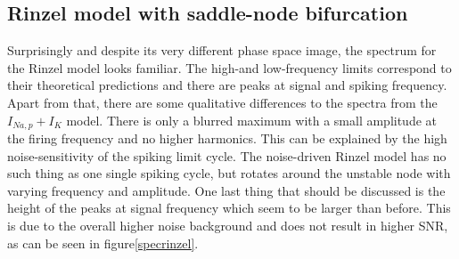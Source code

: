 \documentclass[12pt,a4paper]{article}
\begin{document}
\subsection{Rinzel model with saddle-node bifurcation}
Surprisingly and despite its very different phase space image, the spectrum for the Rinzel model looks familiar. The high-and low-frequency limits correspond to their theoretical predictions and there are peaks at signal and spiking frequency. Apart from that, there are some qualitative differences to the spectra from the $I_{Na,p}+I_K$ model. There is only a blurred maximum with a small amplitude at the firing frequency and no higher harmonics. This can be explained by the high noise-sensitivity of the spiking limit cycle. The noise-driven Rinzel model has no such thing as one single spiking cycle, but rotates around the unstable node with varying frequency and amplitude. One last thing that should be discussed is the height of the peaks at signal frequency which seem to be larger than before. This is due to the overall higher noise background and does not result in higher SNR, as can be seen in figure\ref{specrinzel}.
\end{document}
